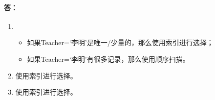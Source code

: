 \paragraph{答：}
\begin{enumerate}
	\item
	\begin{itemize}
		\item 如果Teacher=‘李明’是唯一/少量的，那么使用索引进行选择；
		\item 如果Teacher=‘李明’有很多记录，那么使用顺序扫描。
	\end{itemize}
	\item 使用索引进行选择。
	\item 使用索引进行选择。
\end{enumerate}